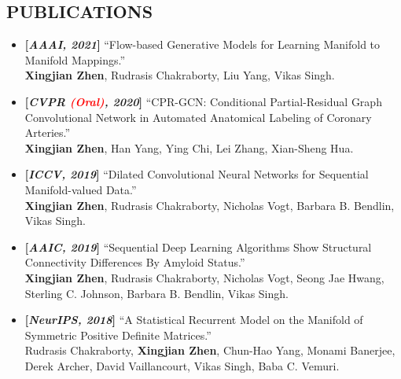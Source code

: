\documentclass[margin]{res}
\begin{document}
\begin{resume}
\section{PUBLICATIONS}
                \begin{itemize}[noitemsep,wide=0pt,leftmargin=\dimexpr{} + 2\relax]\itemsep -0.0pt
                \item \textbf{[\emph{AAAI, 2021}]} ``Flow-based Generative Models for Learning Manifold to Manifold Mappings.''\\
                            \textbf{Xingjian Zhen}, Rudrasis Chakraborty, Liu Yang, Vikas Singh.   
                \item \textbf{[\emph{CVPR \textcolor{red}{(Oral)}, 2020}]} ``CPR-GCN: Conditional Partial-Residual Graph Convolutional Network in Automated Anatomical Labeling of Coronary Arteries.''\\
                            \textbf{Xingjian Zhen}, Han Yang, Ying Chi, Lei Zhang, Xian-Sheng Hua.   
                \item \textbf{[\emph{ICCV, 2019}]} ``Dilated Convolutional Neural Networks for Sequential Manifold-valued Data.'' \\
                             \textbf{Xingjian Zhen}, Rudrasis Chakraborty, Nicholas Vogt, Barbara B. Bendlin, Vikas Singh. 
                \item \textbf{[\emph{AAIC, 2019}]} ``Sequential Deep Learning Algorithms Show Structural Connectivity Differences By Amyloid Status.''\\
                             \textbf{Xingjian Zhen}, Rudrasis Chakraborty, Nicholas Vogt, Seong Jae Hwang, Sterling C. Johnson, Barbara B. Bendlin, Vikas Singh. 
                \item \textbf{[\emph{NeurIPS, 2018}]} ``A Statistical Recurrent Model on the Manifold of Symmetric Positive Definite Matrices.''\\
                             Rudrasis Chakraborty, \textbf{Xingjian Zhen}, Chun-Hao Yang, Monami Banerjee, Derek Archer, David Vaillancourt, Vikas Singh, Baba C. Vemuri.
                \end{itemize}

\vspace{-2em}                

\end{resume}
\end{document}
